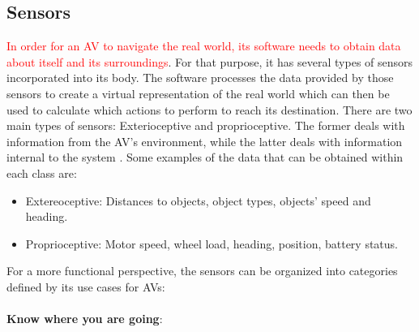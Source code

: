 \documentclass[11pt]{article}
\newcommand{\changed}[1]{\textcolor{red}{#1}}
\begin{document}
\subsection{Sensors}
\changed{In order for an AV to navigate the real world, its software needs to obtain data about itself and its surroundings}. For that purpose, it has several types of sensors incorporated into its body. The software processes the data provided by those sensors to create a virtual representation of the real world which can then be used to calculate which actions to perform to reach its destination. There are two main types of sensors: Exterioceptive and proprioceptive. The former deals with information from the AV's environment, while the latter deals with information internal to the system \cite{BeesonTexas09}. Some examples of the data that can be obtained within each class are:
\begin{itemize}
	\item Extereoceptive: Distances to objects, object types, objects' speed and heading.
	\item Proprioceptive: Motor speed, wheel load, heading, position, battery status.
\end{itemize}
For a more functional perspective, the sensors can be organized into categories defined by its use cases for AVs:
\\\\\textbf{Know where you are going}:
\end{document}
